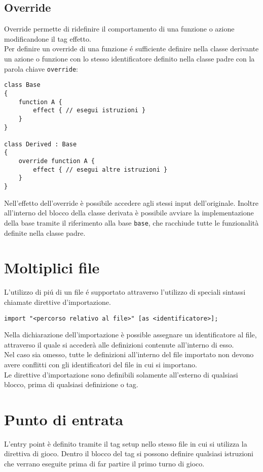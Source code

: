 \subsection{Override}
Override permette di ridefinire il comportamento di una funzione o azione modificandone
il tag effetto. \\ 
Per definire un override di una funzione é sufficiente definire nella classe derivante
un azione o funzione con lo stesso identificatore definito nella classe padre con la 
parola chiave \lstinline|override|:
\begin{lstlisting}
class Base 
{
    function A { 
        effect { // esegui istruzioni } 
    }
}

class Derived : Base
{
    override function A { 
        effect { // esegui altre istruzioni }
    }
}
\end{lstlisting}
Nell'effetto dell'override è possibile accedere agli stessi input dell'originale. 
Inoltre all'interno del blocco della classe derivata è possibile avviare la implementazione 
della base tramite il riferimento alla base \lstinline|base|, che racchiude
tutte le funzionalità definite nella classe padre. 

\section{Moltiplici file} \label{MultipleFiles}
L'utilizzo di piú di un file é supportato attraverso l'utilizzo di speciali sintassi
chiamate direttive d'importazione. 
\begin{lstlisting}
import "<percorso relativo al file>" [as <identificatore>];
\end{lstlisting}
Nella dichiarazione dell'importazione è possible assegnare un identificatore al file, 
attraverso il quale si accederà alle definizioni contenute all'interno di esso. \\
Nel caso sia omesso, tutte le definizioni all'interno del file importato non devono avere
conflitti con gli identificatori del file in cui si importano. \\
Le direttive d'importazione sono definibili solamente all'esterno di qualsiasi blocco,
prima di qualsiasi definizione o tag. 

\section{Punto di entrata}
L'entry point è definito tramite il tag setup nello stesso file in cui 
si utilizza la direttiva di gioco.
Dentro il blocco del tag si possono definire qualsiasi istruzioni che verrano eseguite
prima di far partire il primo turno di gioco.

